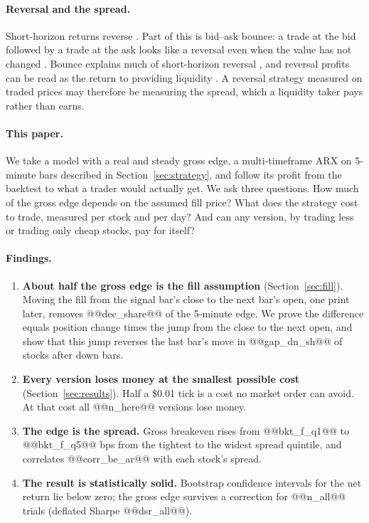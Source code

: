 \documentclass[11pt,a4paper]{article}
\begin{document}
\paragraph{Reversal and the spread.} Short-horizon returns reverse
\citep{lehmann1990}. Part of this is bid--ask bounce: a trade at the bid followed by a trade at the ask
looks like a reversal even when the value has not changed \citep{roll1984}. Bounce explains much of
short-horizon reversal \citep{kaul1990,jegadeesh1995}, and reversal profits can be read as the return to
providing liquidity \citep{nagel2012}. A reversal strategy measured on
traded prices may therefore be measuring the spread, which a liquidity taker pays rather than earns.

\paragraph{This paper.} We take a model with a real and steady gross edge, a multi-timeframe ARX on
5-minute bars described in Section~\ref{sec:strategy}, and follow its profit from the backtest to what a
trader would actually get. We ask three questions. How much of the gross edge depends on the assumed
fill price? What does the strategy cost to trade, measured per stock and per day? And can any version,
by trading less or trading only cheap stocks, pay for itself?

\paragraph{Findings.}
\begin{enumerate}
\item \textbf{About half the gross edge is the fill assumption} (Section~\ref{sec:fill}). Moving the fill
from the signal bar's close to the next bar's open, one print later, removes @@dec_share@@ of the 5-minute
edge. We prove the difference equals position change times the jump from the close to the next open,
and show that this jump reverses the last bar's move in @@gap_dn_sh@@ of stocks after down bars.
\item \textbf{Every version loses money at the smallest possible cost} (Section~\ref{sec:results}). Half a
\$0.01 tick is a cost no market order can avoid. At that cost all @@n_here@@ versions lose money.
\item \textbf{The edge is the spread.} Gross breakeven rises from @@bkt_f_q1@@ to @@bkt_f_q5@@ bps from the
tightest to the widest spread quintile, and correlates @@corr_be_ar@@ with each stock's spread.
\item \textbf{The result is statistically solid.} Bootstrap confidence intervals for the net return lie
below zero; the gross edge survives a correction for @@n_all@@ trials (deflated Sharpe @@dsr_all@@).
\end{enumerate}
\end{document}
